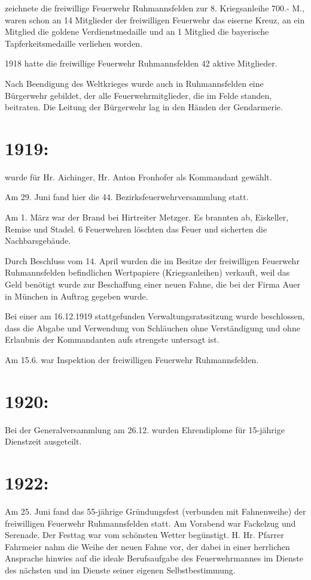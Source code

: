 \documentclass[12pt,a4paper]{book}
\begin{document}
zeichnete die freiwillige Feuerwehr Ruhmannsfelden zur 8. Kriegsanleihe 700.-
M., waren schon an 14 Mitglieder der freiwilligen Feuerwehr das eiserne Kreuz,
an ein Mitglied die goldene Verdienstmedaille und an 1 Mitglied die bayerische
Tapferkeitsmedaille verliehen worden.

1918 hatte die freiwillige Feuerwehr Ruhmannsfelden 42 aktive Mitglieder.

Nach Beendigung des Weltkrieges wurde auch in Ruhmannsfelden eine Bürgerwehr
gebildet, der alle Feuerwehrmitglieder, die im Felde standen, beitraten. Die
Leitung der Bürgerwehr lag in den Händen der Gendarmerie.

\section{1919:}

wurde für Hr. Aichinger, Hr. Anton Fronhofer als Kommandant gewählt.

Am 29. Juni fand hier die 44. Bezirksfeuerwehrversammlung statt.

Am 1. März war der Brand bei Hirtreiter Metzger. Es brannten ab, Eiskeller,
Remise und Stadel. 6 Feuerwehren löschten das Feuer und sicherten die
Nachbarsgebäude.

Durch Beschluss vom 14. April wurden die im Besitze der freiwilligen Feuerwehr
Ruhmannsfelden befindlichen Wertpapiere (Kriegsanleihen) verkauft, weil das Geld
benötigt wurde zur Beschaffung einer neuen Fahne, die bei der Firma Auer in
München in Auftrag gegeben wurde.

Bei einer am 16.12.1919 stattgefunden Verwaltungsratssitzung wurde beschlossen,
dass die Abgabe und Verwendung von Schläuchen ohne Verständigung und ohne
Erlaubnis der Kommandanten aufs strengste untersagt ist.

Am 15.6. war Inspektion der freiwilligen Feuerwehr Ruhmannsfelden.

\section{1920:}

Bei der Generalversammlung am 26.12. wurden Ehrendiplome für 15-jährige
Dienstzeit ausgeteilt.

\section{1922:}

Am 25. Juni fand das 55-jährige Gründungsfest (verbunden mit Fahnenweihe) der
freiwilligen Feuerwehr Ruhmannsfelden statt. Am Vorabend war Fackelzug und
Serenade. Der Festtag war vom schönsten Wetter begünstigt. H. Hr. Pfarrer
Fahrmeier nahm die Weihe der neuen Fahne vor, der dabei in einer herrlichen
Ansprache hinwies auf die ideale Berufsaufgabe des Feuerwehrmannes im Dienste
des nächsten und im Dienste seiner eigenen Selbstbestimmung.
\end{document}
